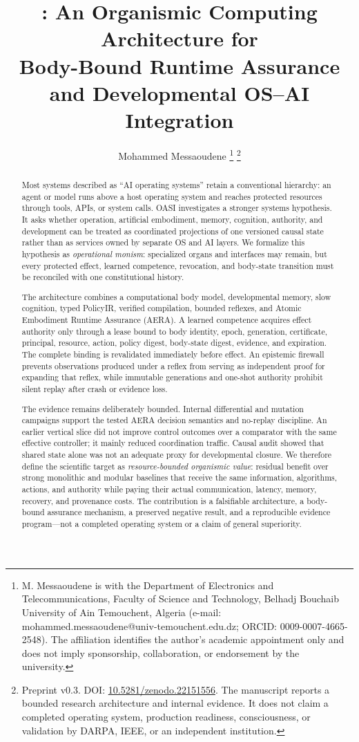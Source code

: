 \documentclass[journal,10pt]{IEEEtran}
\title{\OASI: An Organismic Computing Architecture for\\
Body-Bound Runtime Assurance and Developmental OS--AI Integration}
\author{Mohammed Messaoudene%
\thanks{M. Messaoudene is with the Department of Electronics and Telecommunications, Faculty of Science and Technology, Belhadj Bouchaib University of Ain Temouchent, Algeria (e-mail: mohammed.messaoudene@univ-temouchent.edu.dz; ORCID: 0009-0007-4665-2548). The affiliation identifies the author's academic appointment only and does not imply sponsorship, collaboration, or endorsement by the university.}%
\thanks{Preprint v0.3. DOI: \href{https://doi.org/10.5281/zenodo.22151556}{10.5281/zenodo.22151556}. The manuscript reports a bounded research architecture and internal evidence. It does not claim a completed operating system, production readiness, consciousness, or validation by DARPA, IEEE, or an independent institution.}}
\newcommand{\OASI}{\textsc{OASI}}
\newcommand{\AERA}{\textsc{AERA}}
\begin{document}
\maketitle

\begin{abstract}
Most systems described as ``AI operating systems'' retain a conventional hierarchy: an agent or model runs above a host operating system and reaches protected resources through tools, APIs, or system calls. \OASI{} investigates a stronger systems hypothesis. It asks whether operation, artificial embodiment, memory, cognition, authority, and development can be treated as coordinated projections of one versioned causal state rather than as services owned by separate OS and AI layers. We formalize this hypothesis as \emph{operational monism}: specialized organs and interfaces may remain, but every protected effect, learned competence, revocation, and body-state transition must be reconciled with one constitutional history.

The architecture combines a computational body model, developmental memory, slow cognition, typed PolicyIR, verified compilation, bounded reflexes, and Atomic Embodiment Runtime Assurance (\AERA). A learned competence acquires effect authority only through a lease bound to body identity, epoch, generation, certificate, principal, resource, action, policy digest, body-state digest, evidence, and expiration. The complete binding is revalidated immediately before effect. An epistemic firewall prevents observations produced under a reflex from serving as independent proof for expanding that reflex, while immutable generations and one-shot authority prohibit silent replay after crash or evidence loss.

The evidence remains deliberately bounded. Internal differential and mutation campaigns support the tested \AERA{} decision semantics and no-replay discipline. An earlier vertical slice did not improve control outcomes over a comparator with the same effective controller; it mainly reduced coordination traffic. Causal audit showed that shared state alone was not an adequate proxy for developmental closure. We therefore define the scientific target as \emph{resource-bounded organismic value}: residual benefit over strong monolithic and modular baselines that receive the same information, algorithms, actions, and authority while paying their actual communication, latency, memory, recovery, and provenance costs. The contribution is a falsifiable architecture, a body-bound assurance mechanism, a preserved negative result, and a reproducible evidence program---not a completed operating system or a claim of general superiority.
\end{abstract}
\end{document}
